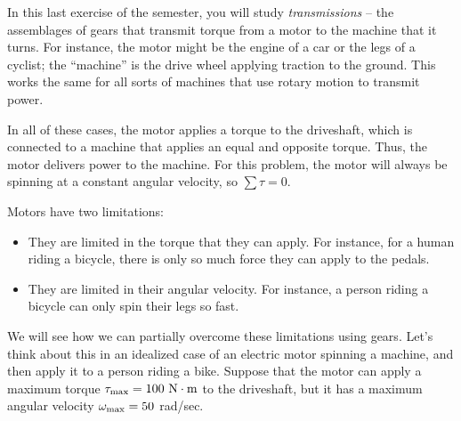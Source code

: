 \documentclass[12pt]{article}
\begin{document}
\newpage

\newpage


\Large
\centerline{}
\normalsize
\centerline{}

In this last exercise of the semester, you will study {\it transmissions} -- the assemblages of gears that transmit torque from a motor to the machine that it turns. For instance, the motor might be the engine of a car or the legs of a cyclist; the ``machine'' is the drive wheel applying traction to the ground. This works the same for all sorts of machines that use rotary motion to transmit power.

In all of these cases, the motor applies a torque to the driveshaft, which is connected to a machine that applies an equal and opposite torque. Thus, the motor delivers power to the machine. For this problem, the motor will always be spinning at a constant angular velocity, so $\sum \tau = 0$.

Motors have two limitations: 

\begin{itemize}
	\item They are limited in the torque that they can apply. For instance, for a human riding a bicycle, there is only so much force they can apply to the pedals.
	\item They are limited in their angular velocity. For instance, a person riding a bicycle can only spin their legs so fast.
\end{itemize}

We will see how we can partially overcome these limitations using gears. Let's think about this in an idealized case of an electric motor spinning a machine, and then apply it to a person riding a bike. Suppose that the motor can apply a maximum torque $\tau_{\rm {max}}=100~\rm N \cdot \rm m$ to the driveshaft, but it has a maximum angular velocity $\omega_{\rm max} = 50$ rad/sec.

\bigskip
\end{document}
